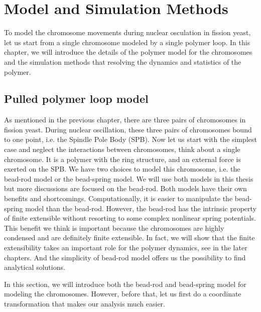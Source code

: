 
\chapter{Model and Simulation Methods}
\graphicspath{{Chapter2/Figs/}}

To model the chromosome movements during nuclear osculation in fission yeast, let us start from a single chromosome modeled by a single polymer loop. 
In this chapter, we will introduce the details of the polymer model for the chromosomes and the simulation methods that resolving the dynamics and statistics of the polymer. 


\section{Pulled polymer loop model}
\label{sec:pulled_polymer_loop_model}

As mentioned in the previous chapter, there are three pairs of chromosomes in fission yeast. During nuclear oscillation, these three pairs of chromosomes bound to one point, i.e. the Spindle Pole Body (SPB). Now let us start with the simplest case and neglect the interactions between chromosomes, think about a single chromosome. It is a polymer with the ring structure, and an external force is exerted on the SPB. We have two choices to model this chromosome, i.e. the bead-rod model or the bead-spring model. We will use both models in this thesis but more discussions are focused on the bead-rod. Both models have their own benefits and shortcomings. Computationally, it is easier to manipulate the bead-spring model than the bead-rod. However, the bead-rod has the intrinsic property of finite extensible without resorting to some complex nonlinear spring potentials. This benefit we think is important because the chromosomes are highly condensed and are definitely finite extensible. In fact, we will show that the finite extensibility takes an important role for the polymer dynamics, see in the later chapters. And the simplicity of bead-rod model offers us the possibility to find analytical solutions. 

In this section, we will introduce both the bead-rod and bead-spring model for modeling the chromosomes. However, before that, let us first do a coordinate transformation that makes our analysis much easier. 

